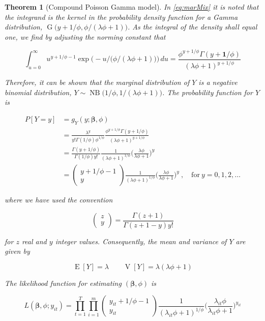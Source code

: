 \documentclass[a4paper,twoside,11pt]{report} %
\DeclareMathOperator{\E}{E}
\DeclareMathOperator{\V}{V}
\DeclareMathOperator{\G}{G}
\DeclareMathOperator{\NB}{NB}
\newtheorem{theorem}{Theorem}[chapter]
\theoremstyle{definition}
\theoremstyle{definition}
\theoremstyle{definition}
\theoremstyle{definition}
\theoremstyle{remark}
\begin{document}
\begin{theorem}[Compound Poisson Gamma model]
In \eqref{eq:marMix} it is noted that the integrand is the \emph{kernel} in the probability density function for a Gamma distribution, \(\G\big(y+1/\phi,\phi/(\lambda \phi+1)\big)\). As the integral of the density shall equal one, we find by adjusting the norming constant that

\begin{equation}
  \int_{u=0}^\infty  u^{ y+ 1/\phi-1} \exp \bigg(- u/\Big(\phi/( \lambda \phi+1)\Big)\bigg) \,du = \frac{\phi^{ y+ 1/\phi}\Gamma( y+\boldsymbol 1/\phi)}{( \lambda \phi + 1)^{y+1/\phi}}
\end{equation}

Therefore, it can be shown that the marginal distribution of \(Y\) is a negative binomial distribution, \(Y\sim\NB\big(1/\phi,1/(\lambda\phi+1)\big)\). The probability function for \(Y\) is

\begin{equation} \label{eq:pdfMix}
  \begin{aligned}
    P[Y=y]&=g_{Y}(y;\boldsymbol \beta, \phi) \\
    &=\frac{\lambda^{y}}{y!\Gamma(1/\phi)\phi^{1/\phi}}\frac{\phi^{y+1/\phi}\Gamma(y+1/\phi)}{(\lambda \phi + 1)^{y+1/\phi}} \\
    &=\frac{\Gamma(y+1/\phi)}{\Gamma(1/\phi)y!}\frac{1}{(\lambda\phi+1)^{1/\phi}}\bigg(\frac{\lambda\phi}{\lambda\phi+1}\bigg)^{y} \\
    &=\begin{pmatrix} y+1/\phi-1 \\ y \end{pmatrix} \frac{1}{(\lambda\phi+1)^{1/\phi}}\bigg(\frac{\lambda\phi}{\lambda\phi+1}\bigg)^{y} \ , \quad \mathrm{for} \ y = 0, 1, 2, \dots
  \end{aligned}
\end{equation}

where we have used the convention

\begin{equation}
  \begin{pmatrix} z\\y \end{pmatrix} = \frac{\Gamma(z+1)}{\Gamma(z+1-y)y!}
\end{equation}

for \(z\) real and \(y\) integer values. Consequently, the mean and variance of \(Y\) are given by

\begin{equation}
  \E[Y] = \lambda \qquad \V[Y] = \lambda (\lambda \phi + 1)
\end{equation}

The likelihood function for estimating \((\boldsymbol \beta,\phi)\) is

\begin{equation}
  L(\boldsymbol \beta, \phi; y_{it})=\prod_{t=1}^{T}\prod_{i=1}^{m} \begin{pmatrix} y_{it}+1/\phi-1 \\ y_{it} \end{pmatrix} \frac{1}{(\lambda_{it}\phi+1)^{1/\phi}}\bigg(\frac{\lambda_{it}\phi}{\lambda_{it}\phi+1}\bigg)^{y_{it}}
\end{equation}
\end{theorem}
\end{document}
